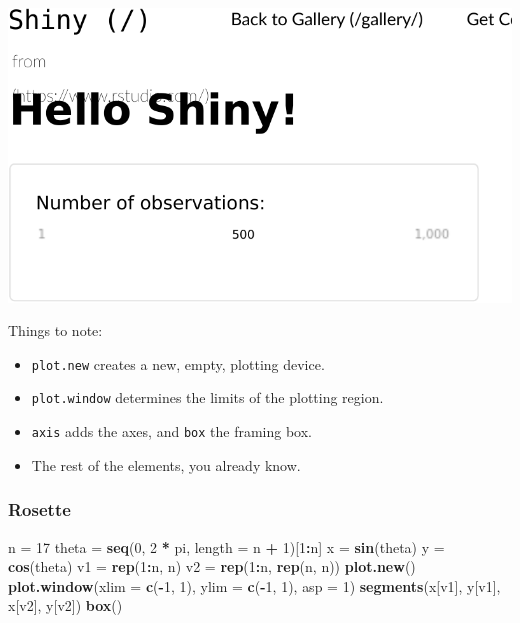 \documentclass[]{book}
\newenvironment{Shaded}{\begin{snugshade}}{\end{snugshade}}
\newcommand{\KeywordTok}[1]{\textcolor[rgb]{0.13,0.29,0.53}{\textbf{#1}}}
\newcommand{\DataTypeTok}[1]{\textcolor[rgb]{0.13,0.29,0.53}{#1}}
\newcommand{\DecValTok}[1]{\textcolor[rgb]{0.00,0.00,0.81}{#1}}
\newcommand{\StringTok}[1]{\textcolor[rgb]{0.31,0.60,0.02}{#1}}
\newcommand{\OperatorTok}[1]{\textcolor[rgb]{0.81,0.36,0.00}{\textbf{#1}}}
\newcommand{\NormalTok}[1]{#1}
\providecommand{\tightlist}{%
  \setlength{\itemsep}{0pt}\setlength{\parskip}{0pt}}
\theoremstyle{definition}
\theoremstyle{definition}
\theoremstyle{definition}
\theoremstyle{remark}
\begin{document}
\includegraphics[width=0.5\linewidth]{Rcourse_files/figure-latex/unnamed-chunk-256-1}

Things to note:

\begin{itemize}
\tightlist
\item
  \texttt{plot.new} creates a new, empty, plotting device.
\item
  \texttt{plot.window} determines the limits of the plotting region.
\item
  \texttt{axis} adds the axes, and \texttt{box} the framing box.
\item
  The rest of the elements, you already know.
\end{itemize}

\subsubsection{Rosette}\label{rosette}

\begin{Shaded}
\begin{Highlighting}[]
\NormalTok{n =}\StringTok{ }\DecValTok{17}
\NormalTok{theta =}\StringTok{ }\KeywordTok{seq}\NormalTok{(}\DecValTok{0}\NormalTok{, }\DecValTok{2} \OperatorTok{*}\StringTok{ }\NormalTok{pi, }\DataTypeTok{length =}\NormalTok{ n }\OperatorTok{+}\StringTok{ }\DecValTok{1}\NormalTok{)[}\DecValTok{1}\OperatorTok{:}\NormalTok{n]}
\NormalTok{x =}\StringTok{ }\KeywordTok{sin}\NormalTok{(theta)}
\NormalTok{y =}\StringTok{ }\KeywordTok{cos}\NormalTok{(theta)}
\NormalTok{v1 =}\StringTok{ }\KeywordTok{rep}\NormalTok{(}\DecValTok{1}\OperatorTok{:}\NormalTok{n, n)}
\NormalTok{v2 =}\StringTok{ }\KeywordTok{rep}\NormalTok{(}\DecValTok{1}\OperatorTok{:}\NormalTok{n, }\KeywordTok{rep}\NormalTok{(n, n))}
\KeywordTok{plot.new}\NormalTok{()}
\KeywordTok{plot.window}\NormalTok{(}\DataTypeTok{xlim =} \KeywordTok{c}\NormalTok{(}\OperatorTok{-}\DecValTok{1}\NormalTok{, }\DecValTok{1}\NormalTok{), }\DataTypeTok{ylim =} \KeywordTok{c}\NormalTok{(}\OperatorTok{-}\DecValTok{1}\NormalTok{, }\DecValTok{1}\NormalTok{), }\DataTypeTok{asp =} \DecValTok{1}\NormalTok{)}
\KeywordTok{segments}\NormalTok{(x[v1], y[v1], x[v2], y[v2])}
\KeywordTok{box}\NormalTok{()}
\end{Highlighting}
\end{Shaded}
\end{document}
